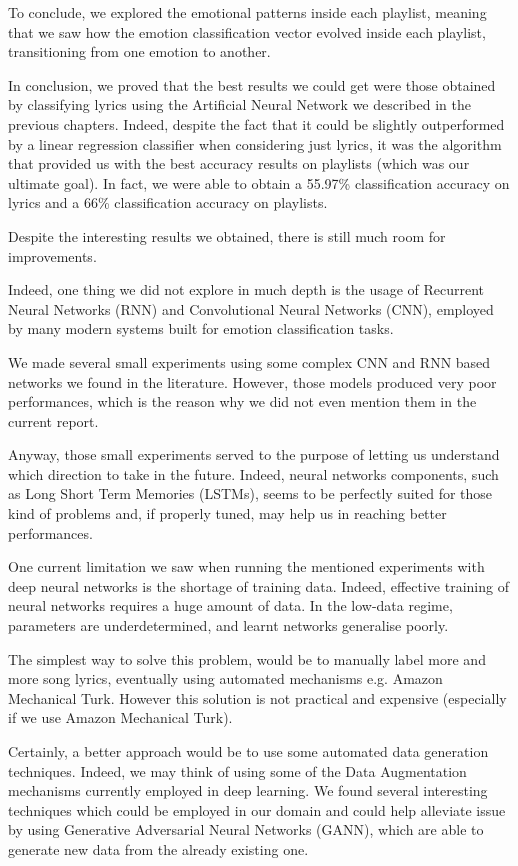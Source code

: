 To conclude, we explored the emotional patterns inside each playlist, meaning that we saw how the emotion
classification vector evolved inside each playlist, transitioning from one emotion to another.

In conclusion, we proved that the best results we could get were those obtained by classifying lyrics using the Artificial Neural Network we described in the previous chapters. Indeed, despite the fact that it could be slightly outperformed by a linear regression classifier when considering just lyrics, it was the algorithm that provided us with the best accuracy results on playlists (which was our ultimate goal). In fact, we were able to obtain a 55.97\% classification accuracy on lyrics and a 66\% classification accuracy on playlists.



Despite the interesting results we obtained, there is still much room
for improvements.

Indeed, one thing we did not explore in much depth is the usage of Recurrent 
Neural Networks (RNN) and Convolutional Neural Networks (CNN), employed by
many modern systems built for emotion classification tasks.

We made several small experiments using some complex CNN and RNN based networks
we found in the literature\cite{text-emotion-classification}. However, those models produced very poor performances,
which is the reason why we did not even mention them in the current report.

Anyway, those small experiments served to the purpose of letting us understand 
which direction to take in the future. Indeed, neural networks components, such as
Long Short Term Memories (LSTMs), seems to be perfectly suited for those kind of problems
and, if properly tuned, may help us in reaching better performances.

One current limitation we saw when running the mentioned experiments with deep neural
networks is the shortage of training data. Indeed, effective training of 
neural networks requires a huge amount of data. In the low-data regime, parameters 
are underdetermined, and learnt networks generalise poorly. 

The simplest way to solve this problem, would be to manually label more and more song lyrics, eventually using
automated mechanisms e.g. Amazon Mechanical Turk\cite{amazon-turk}. However this solution is not practical
and expensive (especially if we use Amazon Mechanical Turk).

Certainly, a better approach would be to use some automated data generation techniques.
Indeed, we may think of using some of the Data Augmentation mechanisms currently employed in deep learning. 
We found several interesting techniques\cite{DBLP:journals/corr/abs-1711-00648} which could be employed in our domain
and could help alleviate issue by using Generative Adversarial Neural Networks (GANN), which
are able to generate new data from the already existing one.
